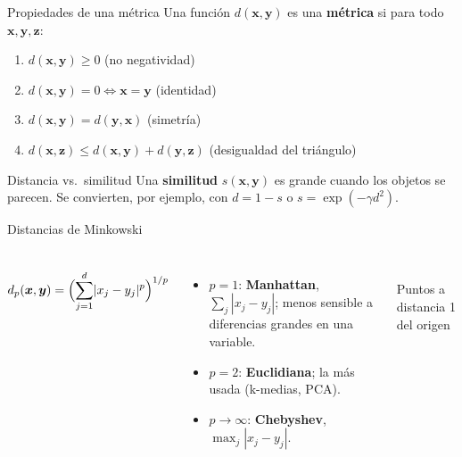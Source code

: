 \documentclass[aspectratio=169,11pt]{beamer}
\newcommand{\x}{\bm{x}}
\newcommand{\y}{\bm{y}}
\begin{document}
\begin{frame}{Propiedades de una métrica}
  Una función $d(\x,\y)$ es una \textbf{métrica} si para todo $\x,\y,\bm{z}$:
  \begin{enumerate}
    \item $d(\x,\y) \ge 0$ \hfill (no negatividad)
    \item $d(\x,\y) = 0 \iff \x = \y$ \hfill (identidad)
    \item $d(\x,\y) = d(\y,\x)$ \hfill (simetría)
    \item $d(\x,\bm{z}) \le d(\x,\y) + d(\y,\bm{z})$ \hfill (desigualdad del triángulo)
  \end{enumerate}
  \vspace{6pt}
  \begin{block}{Distancia vs.\ similitud}
    Una \textbf{similitud} $s(\x,\y)$ es grande cuando los objetos se parecen.
    Se convierten, por ejemplo, con $d = 1 - s$ o $s = \exp(-\gamma d^2)$.
  \end{block}
\end{frame}

\begin{frame}{Distancias de Minkowski}
  \begin{columns}[c]
    \[
      d_p(\x,\y) = \Bigl(\sum_{j=1}^{d}\lvert x_j - y_j\rvert^p\Bigr)^{1/p}
    \]
    \begin{itemize}
      \item $p = 1$: \textbf{Manhattan}, $\sum_j |x_j - y_j|$; menos sensible a diferencias grandes en una variable.
      \item $p = 2$: \textbf{Euclidiana}; la más usada (k-medias, PCA).
      \item $p\to\infty$: \textbf{Chebyshev}, $\max_j |x_j - y_j|$.
    \end{itemize}
    \centering
    \\
    {\small Puntos a distancia 1 del origen}
  \end{columns}
\end{frame}
\end{document}
